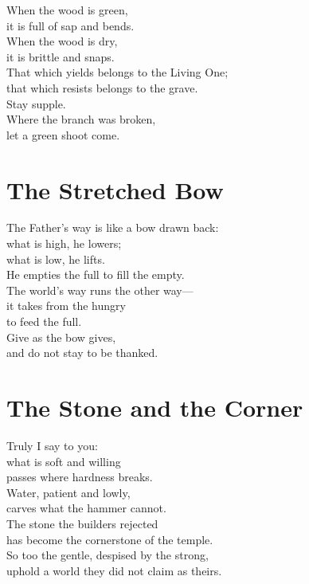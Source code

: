 \documentclass[10pt, openright]{book}
\newcommand{\sectionbreak}{\filbreak}
\newcommand{\sayingsource}[1]{\par\nopagebreak\vspace{0.3\baselineskip}{\raggedleft\footnotesize\itshape #1\par}}
\begin{document}
When the wood is green,\\
it is full of sap and bends.\\
When the wood is dry,\\
it is brittle and snaps.\\
That which yields belongs to the Living One;\\
that which resists belongs to the grave.\\
Stay supple.\\
Where the branch was broken,\\
let a green shoot come.

\sayingsource{Tao Te Ching 76 · Luke 23:31}

\sectionbreak

\section{The Stretched Bow}\label{the-stretched-bow}

The Father's way is like a bow drawn back:\\
what is high, he lowers;\\
what is low, he lifts.\\
He empties the full to fill the empty.\\
The world's way runs the other way---\\
it takes from the hungry\\
to feed the full.\\
Give as the bow gives,\\
and do not stay to be thanked.

\sayingsource{Tao Te Ching 77 · Luke 1:52--53}

\sectionbreak

\section{The Stone and the Corner}\label{the-stone-and-the-corner}

Truly I say to you:\\
what is soft and willing\\
passes where hardness breaks.\\
Water, patient and lowly,\\
carves what the hammer cannot.\\
The stone the builders rejected\\
has become the cornerstone of the temple.\\
So too the gentle, despised by the strong,\\
uphold a world they did not claim as theirs.
\end{document}
